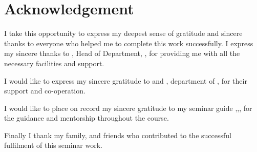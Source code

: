 \chapter*{\centering Acknowledgement}%
%


I take this opportunity to express my deepest sense of gratitude and sincere
thanks to everyone who helped me to complete this work successfully. I express
my sincere thanks to \textbf{ \hod}, Head of Department, \dept,
\college\hspace*{2pt} \collegeplace \hspace*{2pt} for providing me with all the
necessary facilities and support.

I would like to express my sincere gratitude to \textbf{\semcordinatorA} and
\textbf{\semcordinatorB}, \hspace*{2pt} department of \hspace*{2pt} \dept,
\hspace*{2pt} \college \hspace*{2pt} \collegeplace \hspace*{2pt} for their
support and co-operation.

\noindent I would like to place on record my sincere gratitude to my seminar guide \textbf{\guide},\hspace*{2pt}\guidedes,\hspace*{2pt}\dept,\hspace*{2pt}\college \hspace*{2pt} for the guidance and mentorship throughout the course.

Finally I thank my family, and friends who contributed to the successful
fulfilment of this seminar work.

\vspace*{30pt}
\begin{flushright}
	\textbf{\author}
\end{flushright}
\thispagestyle{plain}
